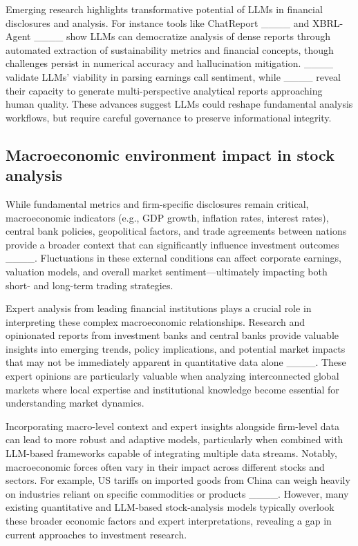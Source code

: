 Emerging research highlights transformative potential of LLMs in financial disclosures and analysis. For instance tools like ChatReport ____ and XBRL-Agent ____ show LLMs can democratize analysis of dense reports through automated extraction of sustainability metrics and financial concepts, though challenges persist in numerical accuracy and hallucination mitigation. ____ validate LLMs’ viability in parsing earnings call sentiment, while ____ reveal their capacity to generate multi-perspective analytical reports approaching human quality. These advances suggest LLMs could reshape fundamental analysis workflows, but require careful governance to preserve informational integrity.

\subsection{Macroeconomic environment impact in stock analysis}
While fundamental metrics and firm-specific disclosures remain critical, macroeconomic indicators (e.g., GDP growth, inflation rates, interest rates), central bank policies, geopolitical factors, and trade agreements between nations provide a broader context that can significantly influence investment outcomes ____. Fluctuations in these external conditions can affect corporate earnings, valuation models, and overall market sentiment—ultimately impacting both short- and long-term trading strategies.

Expert analysis from leading financial institutions plays a crucial role in interpreting these complex macroeconomic relationships. Research and opinionated reports from investment banks and central banks provide valuable insights into emerging trends, policy implications, and potential market impacts that may not be immediately apparent in quantitative data alone ____. These expert opinions are particularly valuable when analyzing interconnected global markets where local expertise and institutional knowledge become essential for understanding market dynamics.

Incorporating macro-level context and expert insights alongside firm-level data can lead to more robust and adaptive models, particularly when combined with LLM-based frameworks capable of integrating multiple data streams. Notably, macroeconomic forces often vary in their impact across different stocks and sectors. For example, US tariffs on imported goods from China can weigh heavily on industries reliant on specific commodities or products ____. However, many existing quantitative and LLM-based stock-analysis models typically overlook these broader economic factors and expert interpretations, revealing a gap in current approaches to investment research.